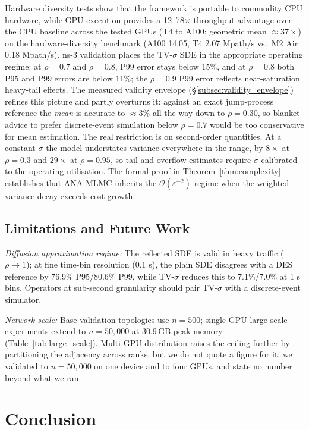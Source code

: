 \documentclass{ieeeaccess}
\begin{document}
Hardware diversity tests show that the framework is portable to commodity CPU hardware, while
GPU execution provides a 12--78$\times$ throughput advantage over the CPU baseline across the
tested GPUs (T4 to A100; geometric mean ${\approx}37\times$) on the hardware-diversity benchmark
(A100 14.05, T4 2.07 Mpath/s vs.\ M2 Air 0.18 Mpath/s). ns-3 validation places the TV-$\sigma$ SDE in the appropriate operating
regime: at $\rho=0.7$ and $\rho=0.8$, P99 error stays below 15\%, and at $\rho=0.8$ both P95 and
P99 errors are below 11\%; the $\rho=0.9$ P99 error reflects near-saturation heavy-tail effects.
The measured validity envelope (\S\ref{subsec:validity_envelope}) refines this picture
and partly overturns it: against an exact jump-process reference the \emph{mean} is accurate to
${\approx}3\%$ all the way down to $\rho{=}0.30$, so blanket advice to prefer
discrete-event simulation below $\rho{=}0.7$ would be too conservative for mean estimation. The real
restriction is on second-order quantities. At a constant $\sigma$ the model understates variance
everywhere in the range, by $8\times$ at $\rho{=}0.3$ and $29\times$ at $\rho{=}0.95$, so tail
and overflow estimates require $\sigma$ calibrated to the operating utilisation. The formal proof in Theorem~\ref{thm:complexity} establishes that ANA-MLMC inherits the
$\mathcal{O}(\varepsilon^{-2})$ regime when the weighted variance decay exceeds cost growth.

\subsection{Limitations and Future Work}
\label{subsec:limitations}

\textit{Diffusion approximation regime:}
The reflected SDE is valid in heavy traffic ($\rho\to1$); at fine time-bin resolution (0.1 s),
the plain SDE disagrees with a DES reference by 76.9\% P95/80.6\% P99, while TV-$\sigma$
reduces this to 7.1\%/7.0\% at 1 s bins. Operators at sub-second granularity should pair
TV-$\sigma$ with a discrete-event simulator.

\textit{Network scale:}
Base validation topologies use $n{=}500$; single-GPU large-scale experiments extend to
$n{=}50{,}000$ at 30.9\,GB peak memory (Table~\ref{tab:large_scale}). Multi-GPU distribution
raises the ceiling further by partitioning the adjacency across ranks, but we do not quote a
figure for it: we validated to $n{=}50{,}000$ on one device and to four GPUs, and state no
number beyond what we ran.

\section{Conclusion}
\end{document}
